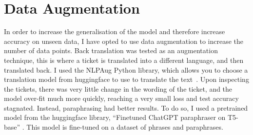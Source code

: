 \documentclass{UoYCSproject}
\begin{document}
%


    \section{Data Augmentation}\label{sec:data-augmentation}
    In order to increase the generalisation of the model and therefore increase accuracy on unseen data, I have opted to use data augmentation to increase the number of data points.
    Back translation was tested as an augmentation technique, this is where a ticket is translated into a different language, and then translated back.
    I used the NLPAug Python library, which allows you to choose a translation model from huggingface to use to translate the text~\cite{ma2019nlpaug}.
    Upon inspecting the tickets, there was very little change in the wording of the ticket, and the model over-fit much more quickly, reaching a very small loss and test accuracy stagnated.
    Instead, paraphrasing had better results.
    To do so, I used a pretrained model from the huggingface library, ``Finetuned ChatGPT paraphraser on T5-base'' \cite{chatgpt_paraphraser}.
    This model is fine-tuned on a dataset of phrases and paraphrases.
\end{document}
